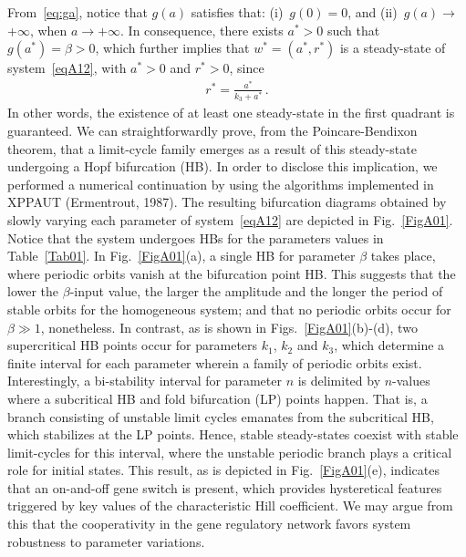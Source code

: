 \documentclass[%
 preprint,
 amsmath,amssymb,
 aps,
]{revtex4-2}
\begin{document}
	{From~\eqref{eq:ga}, notice that $g(a)$ satisfies that: (i)~$g(0) = 0$, and (ii)~$g(a)\rightarrow$ +$\infty$, when  $a\rightarrow +\infty$. In consequence, there exists $a^*>0$ such that $g(a^*) = \beta> 0 $, which further implies that $w^*=(a^*, r^*)$ is a steady-state of system~\eqref{eqA12}, with $a^* >0$ and $r^*>0$, since }
	\begin{gather*}
	r^* = \frac{a^*}{k_3+a^*}\,.
	\end{gather*}
	In other words, the existence of at least one steady-state in the first quadrant is guaranteed. We can straightforwardly  prove, from the Poincare-Bendixon theorem, that a limit-cycle family emerges as a result of this steady-state undergoing a Hopf bifurcation (HB). In order to disclose this implication, we performed a numerical continuation by using the algorithms implemented in XPPAUT (Ermentrout, 1987). The resulting bifurcation diagrams obtained by slowly varying each parameter of system~\eqref{eqA12} are depicted in Fig.~\ref{FigA01}. Notice that the system undergoes HBs for the parameters values in Table~\ref{Tab01}. In Fig.~\ref{FigA01}(a), a single HB for parameter $\beta$ takes place, where periodic orbits vanish at the bifurcation point HB. This suggests that the lower the $\beta$-input value, the larger the amplitude and the longer the period of stable orbits for the homogeneous system; and that no periodic orbits occur for $\beta\gg1$, nonetheless. In contrast, as is shown in Figs.~\ref{FigA01}(b)-(d), two supercritical HB points occur for parameters $k_1$, $k_2$ and $k_3$, which determine a finite interval for each parameter wherein a family of periodic orbits exist. Interestingly, a bi-stability interval for parameter $n$ is delimited by $n$-values where a subcritical HB and fold bifurcation (LP) points happen. That is, a branch consisting of unstable limit cycles emanates from the subcritical HB, which stabilizes at the LP points. Hence, stable steady-states coexist with stable limit-cycles for this interval, where the unstable periodic branch plays a critical role for initial states. This result, as is depicted in Fig.~\ref{FigA01}(e), indicates that an on-and-off gene switch is present, which provides hysteretical features triggered by key values of the characteristic Hill coefficient. We may argue from this that the cooperativity in the gene regulatory network favors system robustness to parameter variations.
	
\end{document}
